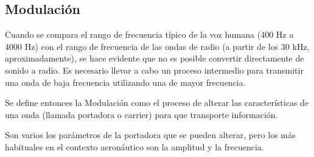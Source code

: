 \subsection{Modulaci\'on}

Cuando se compara el rango de frecuencia t\'ipico de la voz humana (400 Hz a 4000 Hz) con el rango de frecuencia de las ondas de radio (a partir de los 30 kHz, aproximadamente), se hace evidente que no es posible convertir directamente de sonido a radio. Es necesario llevar a cabo un proceso intermedio para transmitir una onda de baja frecuencia utilizando una de mayor frecuencia.

Se define entonces la Modulaci\'on como el proceso de alterar las caracter\'isticas de una onda (llamada portadora o carrier) para que transporte informaci\'on.

Son varios los par\'ametros de la portadora que se pueden alterar, pero los m\'as habituales en el contexto aeron\'autico son la amplitud y la frecuencia.


